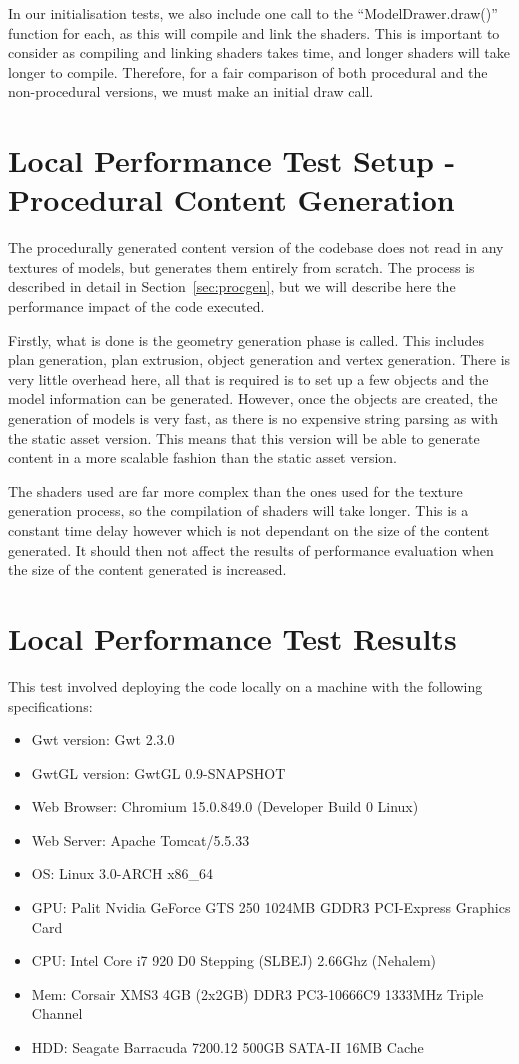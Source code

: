 In our initialisation tests, we also include one call to the ``ModelDrawer.draw()'' function for each, as this will compile and link the shaders.
This is important to consider as compiling and linking shaders takes time, and longer shaders will take longer to compile.
Therefore, for a fair comparison of both procedural and the non-procedural versions, we must make an initial draw call.

\section{Local Performance Test Setup - Procedural Content Generation}
The procedurally generated content version of the codebase does not read in any textures of models, but generates them entirely from scratch.
The process is described in detail in Section~\ref{sec:procgen}, but we will describe here the performance impact of the code executed.

Firstly, what is done is the geometry generation phase is called.
This includes plan generation, plan extrusion, object generation and vertex generation.
There is very little overhead here, all that is required is to set up a few objects and the model information can be generated.
However, once the objects are created, the generation of models is very fast, as there is no expensive string parsing as with the static asset version.
This means that this version will be able to generate content in a more scalable fashion than the static asset version.

The shaders used are far more complex than the ones used for the texture generation process, so the compilation of shaders will take longer.
This is a constant time delay however which is not dependant on the size of the content generated.
It should then not affect the results of performance evaluation when the size of the content generated is increased.

\section{Local Performance Test Results}
This test involved deploying the code locally on a machine with the following specifications:

\begin{itemize}
	\item Gwt version: Gwt 2.3.0
	\item GwtGL version: GwtGL 0.9-SNAPSHOT
	\item Web Browser: Chromium 15.0.849.0 (Developer Build 0 Linux)
	\item Web Server: Apache Tomcat/5.5.33
	\item OS: Linux 3.0-ARCH x86\_64
	\item GPU: Palit Nvidia GeForce GTS 250 1024MB GDDR3 PCI-Express Graphics Card
	\item CPU: Intel Core i7 920 D0 Stepping (SLBEJ) 2.66Ghz (Nehalem)
	\item Mem: Corsair XMS3 4GB (2x2GB) DDR3 PC3-10666C9 1333MHz Triple Channel
	\item HDD: Seagate Barracuda 7200.12 500GB SATA-II 16MB Cache
\end{itemize}

